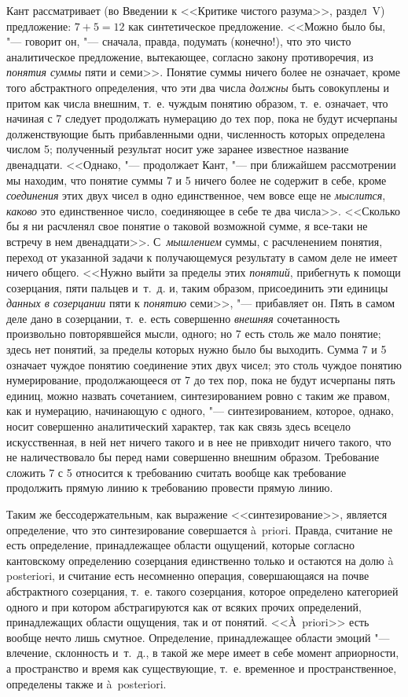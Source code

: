 Кант рассматривает (во Введении к <<Критике чистого разума>>, раздел~V)
предложение: $7 + 5 = 12$ как синтетическое предложение. <<Можно было бы, "---
говорит он, "--- сначала, правда, подумать (конечно!), что это чисто
аналитическое предложение, вытекающее, согласно закону противоречия, из
{\em понятия суммы} пяти и семи>>. Понятие суммы ничего
более не означает, кроме того абстрактного определения, что эти два числа
{\em должны} быть совокуплены и притом как числа
внешним, т.~е. чуждым понятию образом, т.~е. означает, что начиная с 7
следует продолжать нумерацию до тех пор, пока не будут исчерпаны
долженствующие быть прибавленными одни, численность которых определена
числом 5; полученный результат носит уже заранее известное название
двенадцати. <<Однако, "--- продолжает Кант, "--- при ближайшем рассмотрении мы
находим, что понятие суммы 7 и 5 ничего более не содержит в себе, кроме
{\em соединения} этих двух чисел в одно единственное,
чем вовсе еще не {\em мыслится},
{\em каково} это единственное число, соединяющее в себе
те два числа>>. <<Сколько бы я ни расчленял свое понятие о таковой возможной
сумме, я все-таки не встречу в нем двенадцати>>.
С~{\em мышлением} суммы, с расчленением понятия, переход
от указанной задачи к получающемуся результату в самом деле не имеет ничего
общего. <<Нужно выйти за пределы этих {\em понятий},
прибегнуть к помощи созерцания, пяти пальцев и~т.~д. и, таким образом,
присоединить эти единицы {\em данных в созерцании} пяти
к {\em понятию} семи>>, "--- прибавляет он. Пять в самом
деле дано в созерцании, т.~е. есть совершенно
{\em внешняя} сочетанность произвольно повторявшейся
мысли, одного; но 7 есть столь же мало понятие; здесь нет понятий, за
пределы которых нужно было бы выходить. Сумма 7 и 5 означает чуждое понятию
соединение этих двух чисел; это столь чуждое понятию нумерирование,
продолжающееся от 7 до тех пор, пока не будут исчерпаны пять единиц, можно
назвать сочетанием, синтезированием ровно с таким же правом, как и
нумерацию, начинающую с одного, "--- синтезированием, которое, однако, носит
совершенно аналитический характер, так как связь здесь всецело
искусственная, в ней нет ничего такого и в нее не привходит ничего такого,
что не наличествовало бы перед нами совершенно внешним образом. Требование
сложить 7 с 5 относится к требованию считать вообще как требование
продолжить прямую линию к требованию провести прямую линию.

Таким же бессодержательным, как выражение <<синтезирование>>, является
определение, что это синтезирование совершается à~priori. Правда, считание
не есть определение, принадлежащее области ощущений, которые согласно
кантовскому определению созерцания единственно только и остаются на долю à
posteriori, и считание есть несомненно операция, совершающаяся на почве
абстрактного созерцания, т.~е. такого созерцания, которое определено
категорией одного и при котором абстрагируются как от всяких прочих
определений, принадлежащих области ощущения, так и от понятий. <<À~priori>>
есть вообще нечто лишь смутное. Определение, принадлежащее области эмоций
"--- влечение, склонность и~т.~д., в такой же мере имеет в себе момент
априорности, а пространство и время как существующие, т.~е. временное и
пространственное, определены также и à~posteriori.

